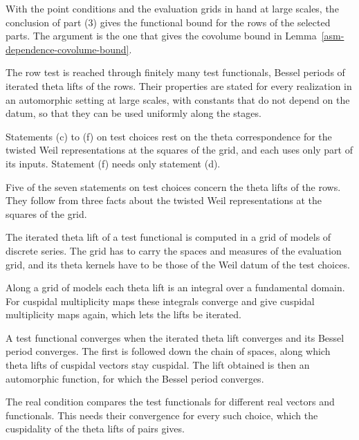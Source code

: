 With the point conditions and the evaluation grids in hand at large scales, the
conclusion of part (3) gives the functional bound for the rows of the selected
parts. The argument is the one that gives the covolume bound in
Lemma~\ref{asm-dependence-covolume-bound}.

The row test is reached through finitely many test functionals, Bessel periods
of iterated theta lifts of the rows. Their properties are stated for every
realization in an automorphic setting at large scales, with constants that do
not depend on the datum, so that they can be used uniformly along the stages.

Statements (c) to (f) on test choices rest on the theta correspondence for the twisted Weil
representations at the squares of the grid, and each uses only part of its inputs. Statement (f)
needs only statement (d).

Five of the seven statements on test choices concern the theta lifts of the rows. They follow from
three facts about the twisted Weil representations at the squares of the grid.

The iterated theta lift of a test functional is computed in a grid of models of discrete series.
The grid has to carry the spaces and measures of the evaluation grid, and its theta kernels have to
be those of the Weil datum of the test choices.

Along a grid of models each theta lift is an integral over a fundamental domain. For cuspidal
multiplicity maps these integrals converge and give cuspidal multiplicity maps again, which lets the
lifts be iterated.

A test functional converges when the iterated theta lift converges and its Bessel period converges.
The first is followed down the chain of spaces, along which theta lifts of cuspidal vectors stay
cuspidal. The lift obtained is then an automorphic function, for which the Bessel period converges.

The real condition compares the test functionals for different real vectors and functionals. This
needs their convergence for every such choice, which the cuspidality of the theta lifts of pairs
gives.

